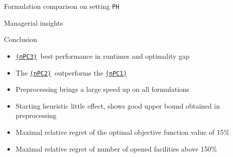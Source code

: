 \documentclass[utf8,aspectratio=169,ngerman,english]{beamer}
\newcommand{\nPC}{\hyperref[eq:nPC]{\texttt{(nPC1)}}\xspace}
\newcommand{\nPCE}{\hyperref[eq:nPCE]{\texttt{(nPC3)}}\xspace}
\newcommand{\nPCY}{\hyperref[eq:nPCY]{\texttt{(nPC2)}}\xspace}
\newcommand{\sH}{\texttt{PH}\xspace}
\begin{document}
\begin{frame}{Formulation comparison on setting \sH}
    \begin{figure}
        \begin{minipage}[c]{.48\linewidth}
        \end{minipage}
        \hfill
        \begin{minipage}[c]{.48\linewidth}
        \end{minipage}
        \label{fig:PH}
    \end{figure}
\end{frame}

\begin{frame}{Managerial insights}
    \begin{figure}
        \begin{minipage}[r]{.48\linewidth}
        \end{minipage}
        \hfill\pause
        \begin{minipage}[l]{.48\linewidth}
        \end{minipage}
        \label{fig:manage}
    \end{figure}
\end{frame}


\begin{frame}{Conclusion}
    \begin{itemize}
        \item \nPCE\ best performance in runtimes and optimality gap
        \item The \nPCY\ outperforms the \nPC
        \item Preprocessing brings a large speed up on all formulations
        \item Starting heuristic little effect, shows good upper bound obtained in preprocessing
        \item Maximal relative regret of the optimal objective function value of 15\%
        \item Maximal relative regret of number of opened facilities above 150\%
    \end{itemize}
\end{frame}
\end{document}
